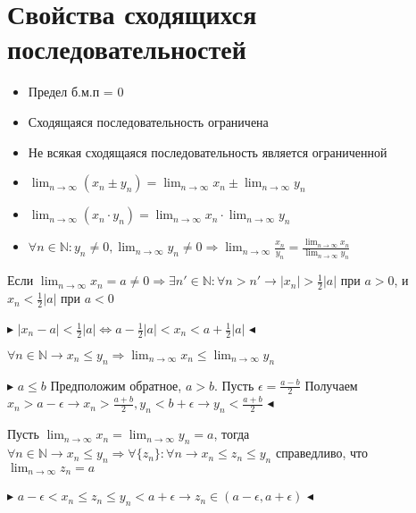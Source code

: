 \documentclass[14pt]{extreport}
\begin{document}
            \section{Свойства сходящихся последовательностей}
            \begin{itemize}
                \item Предел б.м.п = 0
                \item Сходящаяся последовательность ограничена 
                \item Не всякая сходящаяся последовательность является ограниченной
                \item $\lim_{n\rightarrow\infty}(x_n \pm y_n) = \lim_{n\rightarrow\infty}x_n \pm \lim_{n\rightarrow\infty}y_n$
                \item $\lim_{n\rightarrow\infty}(x_n \cdot y_n) = \lim_{n\rightarrow\infty}x_n \cdot \lim_{n\rightarrow\infty}y_n$
                \item $\forall n \in \mathbb{N}: y_n \ne 0,  \lim_{n\rightarrow\infty}y_n \ne 0 \Rightarrow  \lim_{n\rightarrow\infty} \frac{x_n}{y_n} = \frac{ \lim_{n\rightarrow\infty}x_n }{ \lim_{n\rightarrow\infty}y_n } $
            \end{itemize}

            \begin{theorem}
                Если $\lim_{n\rightarrow\infty} x_n = a \neq 0 \Rightarrow \exists n' \in \mathbb{N}: \forall n > n' \rightarrow |x_n| > \frac{1}{2}|a|$ при $a>0$, и $x_n < \frac{1}{2}|a|$ при $a < 0$
            \end{theorem}

            $\blacktriangleright$
                $|x_n - a| < \frac{1}{2}|a| \Leftrightarrow a - \frac{1}{2}|a| < x_n < a + \frac{1}{2}|a|$
            $\blacktriangleleft$

            \begin{theorem}
                $\forall n \in \mathbb{N} \rightarrow x_n \leq y_n \Rightarrow \lim_{n\rightarrow\infty}x_n \leq \lim_{n\rightarrow\infty}y_n$
            \end{theorem}
            $\blacktriangleright$ 
                $a\leq b$ Предположим обратное, $a>b$. Пусть $\epsilon = \frac{a-b}{2}$ Получаем $x_n > a - \epsilon \rightarrow x_n > \frac{a+b}{2}, y_n < b + \epsilon \rightarrow y_n < \frac{a+b}{2}$
            $\blacktriangleleft$

            \begin{theorem}
                 Пусть $\lim_{n\rightarrow\infty}x_n = \lim_{n\rightarrow\infty}y_n = a$, тогда $\forall n \in \mathbb{N} \rightarrow x_n \leq y_n \Rightarrow \forall \{z_n\}: \forall n \rightarrow x_n \leq z_n \leq y_n$ справедливо, что $\lim_{n\rightarrow\infty}z_n = a$
            \end{theorem}
            $\blacktriangleright$
                $a - \epsilon < x_n \leq z_n \leq y_n < a + \epsilon \rightarrow z_n \in (a-\epsilon, a+\epsilon)$
            $\blacktriangleleft$
\end{document}
